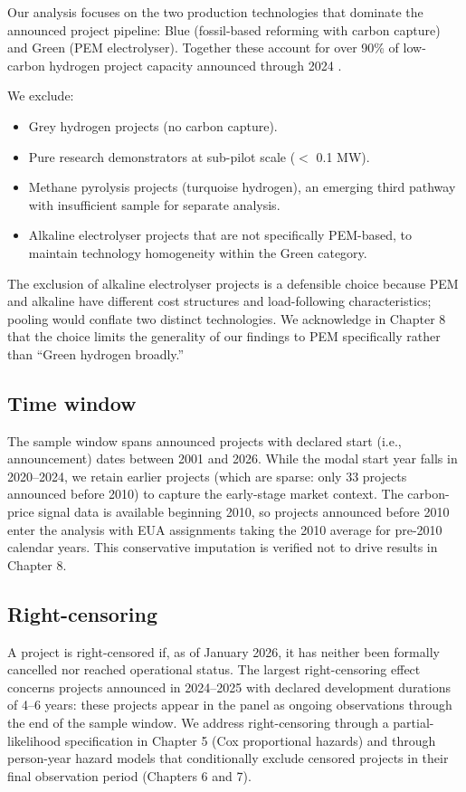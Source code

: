 \documentclass[11pt,a4paper]{article}
\begin{document}
Our analysis focuses on the two production technologies that dominate the announced project pipeline: Blue (fossil-based reforming with carbon capture) and Green (PEM electrolyser). Together these account for over 90\% of low-carbon hydrogen project capacity announced through 2024 \citep{iea2024hydrogenprojects}.

We exclude:
\begin{itemize}
    \item Grey hydrogen projects (no carbon capture).
    \item Pure research demonstrators at sub-pilot scale ($<$ 0.1 MW).
    \item Methane pyrolysis projects (turquoise hydrogen), an emerging third pathway with insufficient sample for separate analysis.
    \item Alkaline electrolyser projects that are not specifically PEM-based, to maintain technology homogeneity within the Green category.
\end{itemize}
The exclusion of alkaline electrolyser projects is a defensible choice because PEM and alkaline have different cost structures and load-following characteristics; pooling would conflate two distinct technologies. We acknowledge in Chapter 8 that the choice limits the generality of our findings to PEM specifically rather than ``Green hydrogen broadly.''

\subsection{Time window}

The sample window spans announced projects with declared start (i.e., announcement) dates between 2001 and 2026. While the modal start year falls in 2020--2024, we retain earlier projects (which are sparse: only 33 projects announced before 2010) to capture the early-stage market context. The carbon-price signal data is available beginning 2010, so projects announced before 2010 enter the analysis with EUA assignments taking the 2010 average for pre-2010 calendar years. This conservative imputation is verified not to drive results in Chapter 8.

\subsection{Right-censoring}

A project is right-censored if, as of January 2026, it has neither been formally cancelled nor reached operational status. The largest right-censoring effect concerns projects announced in 2024--2025 with declared development durations of 4--6 years: these projects appear in the panel as ongoing observations through the end of the sample window. We address right-censoring through a partial-likelihood specification in Chapter 5 (Cox proportional hazards) and through person-year hazard models that conditionally exclude censored projects in their final observation period (Chapters 6 and 7).
\end{document}
